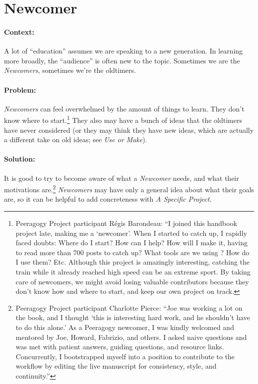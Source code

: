 \section{Newcomer}
\paragraph{Context:}
A lot of ``education'' assumes we are speaking to a new generation. 
In learning more broadly, the ``audience'' is often new to the topic.
Sometimes we are the \emph{Newcomers}, sometimes we're the oldtimers.

\paragraph{Problem:} \emph{Newcomers} can feel overwhelmed by the amount of things to learn.  They
don't know where to start.\footnote{Peeragogy Project participant
R\'egis Barondeau: ``I joined this handbook project late, making me
a `newcomer'. When I started to catch up, I rapidly faced doubts:
Where do I start? How can I help? How will I make it, having to read
more than 700 posts to catch up? What tools are we using ? How do I use
them? Etc. Although this project is amazingly interesting, catching the
train while it already reached high speed can be an extreme sport. By
taking care of newcomers, we might avoid losing valuable contributors
because they don't know how and where to start, and keep our own project
on track.}  They also may have a bunch of ideas that the oldtimers have
never considered (or they may think they have new ideas, which are actually
a different take on old ideas; see \emph{Use or Make}).

\paragraph{Solution:} It is good to try to become aware of what a \emph{Newcomer}
needs, and what their motivations are.\footnote{Peeragogy Project participant
Charlotte Pierce: ``Joe was working a lot on the book, and I thought
`this is interesting hard work, and he shouldn't have to do
this alone.' As a Peeragogy newcomer, I was kindly welcomed and
mentored by Joe, Howard, Fabrizio, and others. I asked naive questions
and was met with patient answers, guiding questions, and resource links.
Concurrently, I bootstrapped myself into a position to contribute to the
workflow by editing the live manuscript for consistency, style, and continuity.''}
\emph{Newcomers} may have only a general idea about what their goals are, so it can be
helpful to add concreteness with \emph{A Specific Project}.

